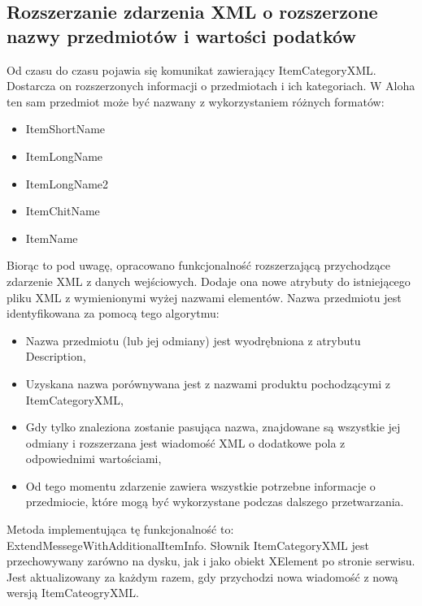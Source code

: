 \documentclass[a4paper]{book}
\begin{document}
\subsection{Rozszerzanie zdarzenia XML o rozszerzone nazwy przedmiotów i wartości podatków}
Od czasu do czasu pojawia się komunikat zawierający ItemCategoryXML. Dostarcza on rozszerzonych informacji o przedmiotach i ich kategoriach. W Aloha ten sam przedmiot może być nazwany z wykorzystaniem różnych formatów:
\begin{itemize}
	\item ItemShortName
	\item ItemLongName
	\item ItemLongName2
	\item ItemChitName
	\item ItemName
\end{itemize}
Biorąc to pod uwagę, opracowano funkcjonalność rozszerzającą przychodzące zdarzenie XML z danych wejściowych.
Dodaje ona nowe atrybuty do istniejącego pliku XML z wymienionymi wyżej nazwami elementów. Nazwa przedmiotu jest identyfikowana za pomocą tego algorytmu:
\begin{itemize}
	\item Nazwa przedmiotu (lub jej odmiany) jest wyodrębniona z atrybutu Description,
	\item Uzyskana nazwa porównywana jest z nazwami produktu pochodzącymi z ItemCategoryXML,
	\item Gdy tylko znaleziona zostanie pasująca nazwa, znajdowane są wszystkie jej odmiany i rozszerzana jest wiadomość XML o dodatkowe pola z odpowiednimi wartościami,
	\item Od tego momentu zdarzenie zawiera wszystkie potrzebne informacje o przedmiocie, które mogą być wykorzystane podczas dalszego przetwarzania.
\end{itemize}
Metoda implementująca tę funkcjonalność to: ExtendMessegeWithAdditionalItemInfo.
Słownik ItemCategoryXML jest przechowywany zarówno na dysku, jak i jako obiekt XElement po stronie serwisu. Jest aktualizowany za każdym razem, gdy przychodzi nowa wiadomość z nową wersją ItemCateogryXML.
\end{document}
